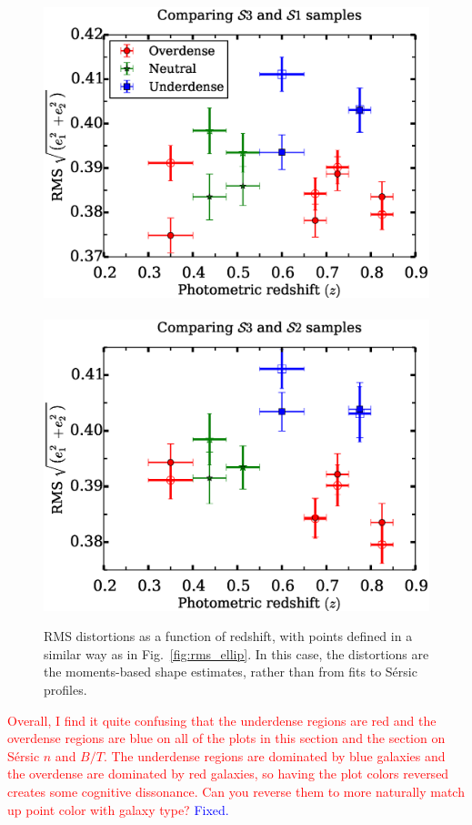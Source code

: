 \documentclass[twocolumn,useAMS,usenatbib]{mn2e}
\newcommand{\rachel}[1]{{\textcolor{red}{#1}}}
\newcommand{\arun}[1]{{\textcolor{blue}{#1}}}
\newcommand{\sersic}{S\'{e}rsic }
\begin{document}
\begin{figure}
 \includegraphics[width=1.0\columnwidth]{rms_ellip_momentbased_noevolution.eps} \
 \includegraphics[width=1.0\columnwidth]{rms_ellip_momentbased_Bbandevolution.eps} \\
 \caption{RMS distortions as a function of redshift, with points
   defined in a similar way as in Fig.~\ref{fig:rms_ellip}.  In this
   case, the distortions are the moments-based shape estimates, rather
   than from fits to \sersic profiles. }
 \label{fig:rms_ellip_momentbased}         
\end{figure}

\rachel{Overall, I find it quite confusing that the underdense regions
  are red and the overdense regions are blue on all of the plots in
  this section and the section on \sersic $n$ and $B/T$.
  The underdense regions are dominated by blue galaxies and the
  overdense are dominated by red galaxies, so having the plot colors
  reversed creates some cognitive dissonance.  Can you reverse them to
  more naturally match up point color with galaxy type?} \arun{Fixed.}
\end{document}
